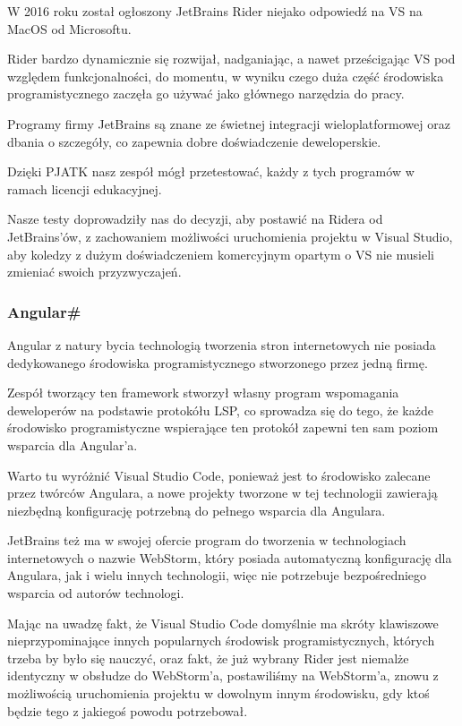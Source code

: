 W 2016 roku został ogłoszony JetBrains Rider niejako odpowiedź na VS na MacOS od Microsoftu.

Rider bardzo dynamicznie się rozwijał, nadganiając, a nawet prześcigając VS pod względem funkcjonalności, do momentu, w wyniku czego duża część środowiska programistycznego zaczęła go używać jako głównego narzędzia do pracy.

Programy firmy JetBrains są znane ze świetnej integracji wieloplatformowej oraz dbania o szczegóły, co zapewnia dobre doświadczenie deweloperskie.

Dzięki PJATK nasz zespół mógł przetestować, każdy z tych programów w ramach licencji edukacyjnej.

Nasze testy doprowadziły nas do decyzji, aby postawić na Ridera od JetBrains'ów, z zachowaniem możliwości uruchomienia projektu w Visual Studio, aby koledzy z dużym doświadczeniem komercyjnym opartym o VS nie musieli zmieniać swoich przyzwyczajeń.

\subsubsection{Angular\#}
Angular z natury bycia technologią tworzenia stron internetowych nie posiada dedykowanego środowiska programistycznego stworzonego przez jedną firmę.

Zespół tworzący ten framework stworzył własny program wspomagania deweloperów na podstawie protokółu LSP, co sprowadza się do tego, że każde środowisko programistyczne wspierające ten protokół zapewni ten sam poziom wsparcia dla Angular'a.

Warto tu wyróżnić Visual Studio Code, ponieważ jest to środowisko zalecane przez twórców Angulara, a nowe projekty tworzone w tej technologii zawierają niezbędną konfigurację potrzebną do pełnego wsparcia dla Angulara.

JetBrains też ma w swojej ofercie program do tworzenia w technologiach internetowych o nazwie WebStorm, który posiada automatyczną konfigurację dla Angulara, jak i wielu innych technologii, więc nie potrzebuje bezpośredniego wsparcia od autorów technologi.

Mając na uwadzę fakt, że Visual Studio Code domyślnie ma skróty klawiszowe nieprzypominające innych popularnych środowisk programistycznych, których trzeba by było się nauczyć, oraz fakt, że już wybrany Rider jest niemalże identyczny w obsłudze do WebStorm'a, postawiliśmy na WebStorm'a, znowu z możliwością uruchomienia projektu w dowolnym innym środowisku, gdy ktoś będzie tego z jakiegoś powodu potrzebował.

